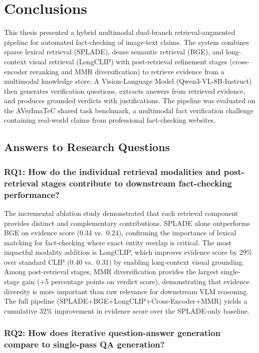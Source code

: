 \chapter{Conclusions}
\label{ch:conclusion}

This thesis presented a hybrid multimodal dual-branch retrieval-augmented pipeline for automated fact-checking of image-text claims. The system combines sparse lexical retrieval (SPLADE), dense semantic retrieval (BGE), and long-context visual retrieval (LongCLIP) with post-retrieval refinement stages (cross-encoder reranking and MMR diversification) to retrieve evidence from a multimodal knowledge store. A Vision-Language Model (Qwen3-VL-8B-Instruct) then generates verification questions, extracts answers from retrieved evidence, and produces grounded verdicts with justifications. The pipeline was evaluated on the AVerImaTeC shared task benchmark, a multimodal fact verification challenge containing real-world claims from professional fact-checking websites.

\section{Answers to Research Questions}

\subsection*{RQ1: How do the individual retrieval modalities and post-retrieval stages contribute to downstream fact-checking performance?}

The incremental ablation study demonstrated that each retrieval component provides distinct and complementary contributions. SPLADE alone outperforms BGE on evidence score (0.34 vs.\ 0.24), confirming the importance of lexical matching for fact-checking where exact entity overlap is critical. The most impactful modality addition is LongCLIP, which improves evidence score by 29\% over standard CLIP (0.40 vs.\ 0.31) by enabling long-context visual grounding. Among post-retrieval stages, MMR diversification provides the largest single-stage gain (+5 percentage points on verdict score), demonstrating that evidence diversity is more important than raw relevance for downstream VLM reasoning. The full pipeline (SPLADE+BGE+LongCLIP+Cross-Encoder+MMR) yields a cumulative 32\% improvement in evidence score over the SPLADE-only baseline.

\subsection*{RQ2: How does iterative question-answer generation compare to single-pass QA generation?}

